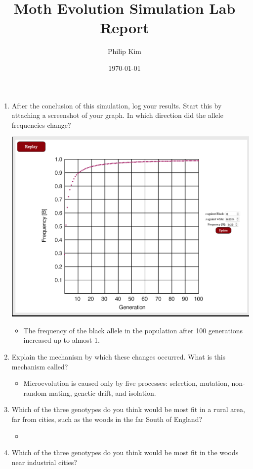 \documentclass{article}
\title{Moth Evolution Simulation Lab Report}
\author{Philip Kim}
\date{\today}
\begin{document}
\maketitle
\begin{enumerate}
  \item After the conclusion of this simulation, log your results. Start this by attaching a screenshot of your graph. In which direction did the allele frequencies change?
  \begin{center}
    \includegraphics[scale=0.3]{white.png}
  \end{center}
  \begin{itemize}
    \item The frequency of the black allele in the population after 100 generations increased up to almost 1.
  \end{itemize}
  \item Explain the mechanism by which these changes occurred. What is this mechanism called?
  \begin{itemize}
    \item Microevolution is caused only by five processes: selection, mutation, non-random mating, genetic drift, and isolation.
  \end{itemize}
  \item Which of the three genotypes do you think would be most fit in a rural area, far from cities, such as the woods in the far South of England?
  \begin{itemize}
    \item
  \end{itemize}
  \item Which of the three genotypes do you think would be most fit in the woods near industrial cities?

\end{enumerate}
\end{document}

